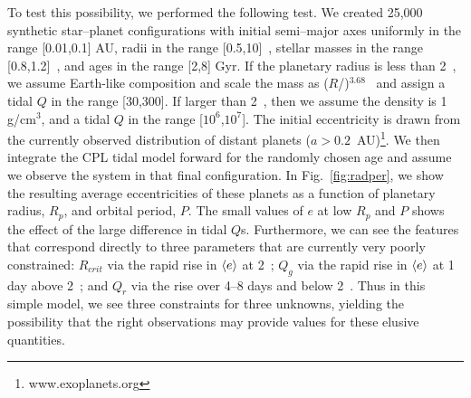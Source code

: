 To test this possibility, we performed the following test. We created
25,000 synthetic star--planet configurations with initial semi--major
axes uniformly in the range [0.01,0.1] AU, radii in the range
[0.5,10]~\rearth, stellar masses in the range [0.8,1.2]~\msun, and
ages in the range [2,8] Gyr.  If the planetary radius is less than 2~\rearth, we
assume Earth-like composition and scale the mass as ($R$/\rearth)$^{3.68}$\mearth~\citep{Sotin07} and
assign a tidal $Q$ in the range [30,300].  If larger than 2~\rearth, then we assume
the density is 1 g/cm$^3$, and a tidal $Q$ in the range
[$10^6$,$10^7$].  The initial eccentricity is drawn from the currently
observed distribution of distant planets ($a > 0.2$~AU)\footnote{www.exoplanets.org}.  We then
integrate the CPL tidal model forward for the randomly chosen age and assume we
observe the system in that final configuration. In
Fig.~\ref{fig:radper}, we show the resulting average eccentricities of
these planets as a function of planetary radius, $R_p$, and orbital
period, $P$.  The small values of $e$ at low $R_p$ and $P$ shows the effect of the large difference in tidal $Q$s.  Furthermore, we can see the features that correspond directly
to three parameters that are currently very poorly constrained:
$R_{crit}$ via the rapid rise in $\left< e \right>$ at 2~\rearth; $Q_g$ via the
rapid rise in $\left< e \right>$ at 1 day above 2~\rearth; and $Q_r$ via the
rise over 4--8 days and below 2~\rearth.  Thus in this simple model,
we see three constraints for three unknowns, yielding the possibility
that the right observations may provide values for these
elusive quantities.

